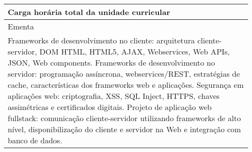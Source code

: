 \begin{quadro}[ht!]
\begin{tabular}{|p{3cm} p{2cm} p{3cm} p{2cm} p{3cm} p{2cm}|}
\multicolumn{5}{|p{13cm}|}{\cellcolor{blue1} Carga horária total da unidade curricular} & \multicolumn{1}{p{1cm}|}{\raggedleft 60	}\\\hline
\multicolumn{6}{|p{15cm}|}{\cellcolor{blue1} Ementa} \\\hline
\hline\multicolumn{6}{|p{15cm}|}{\scriptsize Frameworks de desenvolvimento no cliente: arquitetura cliente-servidor, DOM HTML, HTML5, AJAX, Webservices, Web APIs, JSON, Web components. Frameworks de desenvolvimento no servidor: programação assíncrona, webservices/REST, estratégias de cache, características dos frameworks web e aplicações. Segurança em aplicações web: criptografia, XSS, SQL Inject, HTTPS, chaves assimétricas e certificados digitais. Projeto de aplicação web fullstack: comunicação cliente-servidor utilizando frameworks de alto nível, disponibilização do cliente e servidor na Web e integração com banco de dados.}\\\hline
\hline
	\end{tabular}
\end{quadro}
\clearpage
